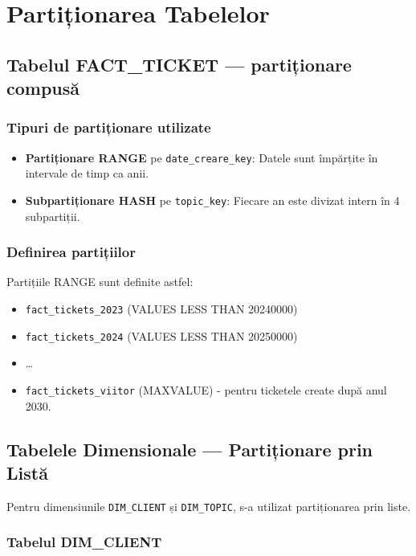 \chapter{Partiționarea Tabelelor}
\label{sec:partitii}

\section{Tabelul FACT\_TICKET — partiționare compusă}

\subsection{Tipuri de partiționare utilizate}

\begin{itemize}
    \item \textbf{Partiționare RANGE} pe \texttt{date\_creare\_key}: Datele sunt împărțite în intervale de timp ca anii. 
    \item \textbf{Subpartiționare HASH} pe \texttt{topic\_key}: Fiecare an este divizat intern în 4 subpartiții.
\end{itemize}

\subsection{Definirea partițiilor}

Partițiile RANGE sunt definite astfel:
\begin{itemize}
    \item \texttt{fact\_tickets\_2023} (VALUES LESS THAN 20240000)
    \item \texttt{fact\_tickets\_2024} (VALUES LESS THAN 20250000)
    \item \dots
    \item \texttt{fact\_tickets\_viitor} (MAXVALUE) - pentru ticketele create după anul 2030.
\end{itemize}

\section{Tabelele Dimensionale — Partiționare prin Listă}

Pentru dimensiunile \texttt{DIM\_CLIENT} și \texttt{DIM\_TOPIC}, s-a utilizat partiționarea prin liste.

\subsection{Tabelul DIM\_CLIENT}

